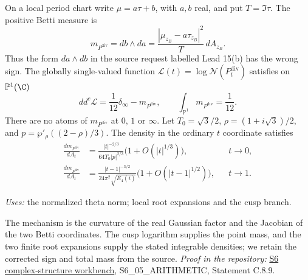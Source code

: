\begin{announcement}[ARI C.8.9; A]\label{ari:C.8.9}
On a local period chart write $\mu=a\tau+b$, with $a,b$ real,
and put $T=\Im\tau$. The positive Betti measure is
\[
 m_{P^{\mathrm{div}}}=db\wedge da
 =\frac{|\mu_{z_B}-a\tau_{z_B}|^2}{T}\,dA_{z_B}.
\]
Thus the form $da\wedge db$ in the source request labelled Lead 15(b) has the wrong sign.
The globally single-valued function $\mathcal L(t)=\log \mathcal N(P^{\mathrm{div}}_t)$ satisfies
on $\mathbb{P}^1(\C)$
\begin{equation}\label{ari:eq:ca-current}
 dd^c\mathcal L=\frac1{12}\delta_\infty-m_{P^{\mathrm{div}}},\qquad
               \int_{\mathbb{P}^1}m_{P^{\mathrm{div}}}=\frac1{12}.
\end{equation}
There are no atoms of $m_{P^{\mathrm{div}}}$ at $0$, $1$ or $\infty$.
Let $T_0=\sqrt3/2$, $\rho=(1+i\sqrt3)/2$, and
$p=\wp'_\rho((2-\rho)/3)$. The density in the ordinary
$t$ coordinate satisfies
\begin{align}
 \frac{dm_{P^{\mathrm{div}}}}{dA_t}
 &=\frac{|t|^{-2/3}}{64T_0|p|^{2/3}}
                      \bigl(1+O(|t|^{1/3})\bigr),
                         &&t\longrightarrow0,\label{ari:eq:ca-density0}\\
 \frac{dm_{P^{\mathrm{div}}}}{dA_t}
 &=\frac{|t-1|^{-3/2}}{24\pi^2\sqrt{E_4(i)}}
                      \bigl(1+O(|t-1|^{1/2})\bigr),
                         &&t\longrightarrow1.\label{ari:eq:ca-density1}
\end{align}
\end{announcement}
\noindent\textit{Uses:} the normalized theta norm; local root expansions and the cusp branch.\par
The mechanism is the curvature of the real Gaussian factor and the Jacobian of the two Betti coordinates. The cusp logarithm supplies the point mass, and the two finite root expansions supply the stated integrable densities; we retain the corrected sign and total mass from the source.
\noindent\textit{Proof in the repository:} \href{https://github.com/KokunoYumeto/s6-complex-structure-workbench}{S6 complex-structure workbench}, S6\_05\_ARITHMETIC, Statement C.8.9.

